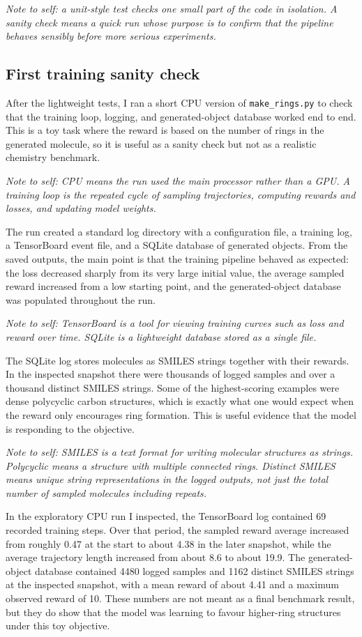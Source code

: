 \documentclass{article}
\begin{document}
\textit{Note to self: a unit-style test checks one small part of the code in isolation. A sanity check means a quick run whose purpose is to confirm that the pipeline behaves sensibly before more serious experiments.}

\subsection{First training sanity check}
After the lightweight tests, I ran a short CPU version of \texttt{make\_rings.py} to check that the training loop, logging, and generated-object database worked end to end. This is a toy task where the reward is based on the number of rings in the generated molecule, so it is useful as a sanity check but not as a realistic chemistry benchmark.

\textit{Note to self: CPU means the run used the main processor rather than a GPU. A training loop is the repeated cycle of sampling trajectories, computing rewards and losses, and updating model weights.}

The run created a standard log directory with a configuration file, a training log, a TensorBoard event file, and a SQLite database of generated objects. From the saved outputs, the main point is that the training pipeline behaved as expected: the loss decreased sharply from its very large initial value, the average sampled reward increased from a low starting point, and the generated-object database was populated throughout the run.

\textit{Note to self: TensorBoard is a tool for viewing training curves such as loss and reward over time. SQLite is a lightweight database stored as a single file.}

The SQLite log stores molecules as SMILES strings together with their rewards. In the inspected snapshot there were thousands of logged samples and over a thousand distinct SMILES strings. Some of the highest-scoring examples were dense polycyclic carbon structures, which is exactly what one would expect when the reward only encourages ring formation. This is useful evidence that the model is responding to the objective.

\textit{Note to self: SMILES is a text format for writing molecular structures as strings. Polycyclic means a structure with multiple connected rings. Distinct SMILES means unique string representations in the logged outputs, not just the total number of sampled molecules including repeats.}

In the exploratory CPU run I inspected, the TensorBoard log contained 69 recorded training steps. Over that period, the sampled reward average increased from roughly 0.47 at the start to about 4.38 in the later snapshot, while the average trajectory length increased from about 8.6 to about 19.9. The generated-object database contained 4480 logged samples and 1162 distinct SMILES strings at the inspected snapshot, with a mean reward of about 4.41 and a maximum observed reward of 10. These numbers are not meant as a final benchmark result, but they do show that the model was learning to favour higher-ring structures under this toy objective.
\end{document}
